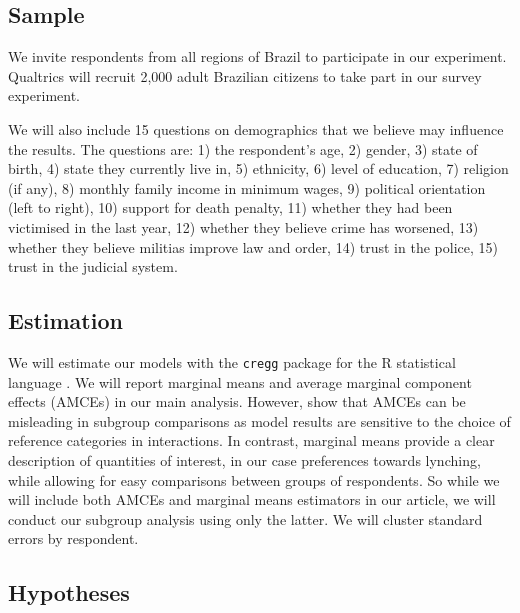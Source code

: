 \documentclass[12pt,a4paper,]{article}
\begin{document}
\hypertarget{sample}{%
\subsection{Sample}\label{sample}}

\label{sub:sample}

We invite respondents from all regions of Brazil to participate in our
experiment. Qualtrics will recruit 2,000 adult Brazilian citizens to
take part in our survey experiment.

We will also include 15 questions on demographics that we believe may
influence the results. The questions are: 1) the respondent's age, 2)
gender, 3) state of birth, 4) state they currently live in, 5)
ethnicity, 6) level of education, 7) religion (if any), 8) monthly
family income in minimum wages, 9) political orientation (left to
right), 10) support for death penalty, 11) whether they had been
victimised in the last year, 12) whether they believe crime has
worsened, 13) whether they believe militias improve law and order, 14)
trust in the police, 15) trust in the judicial system.

\hypertarget{estimation}{%
\subsection{Estimation}\label{estimation}}

\label{sub:estimation}

We will estimate our models with the \texttt{cregg} package
\citep{leeper2018cregg} for the R statistical language
\citep{rstats2019}. We will report marginal means and average marginal
component effects (AMCEs) in our main analysis. However,
\citet{leeper2018subgroup} show that AMCEs can be misleading in subgroup
comparisons as model results are sensitive to the choice of reference
categories in interactions. In contrast, marginal means provide a clear
description of quantities of interest, in our case preferences towards
lynching, while allowing for easy comparisons between groups of
respondents. So while we will include both AMCEs and marginal means
estimators in our article, we will conduct our subgroup analysis using
only the latter. We will cluster standard errors by respondent.

\hypertarget{hypotheses}{%
\subsection{Hypotheses}\label{hypotheses}}
\end{document}
